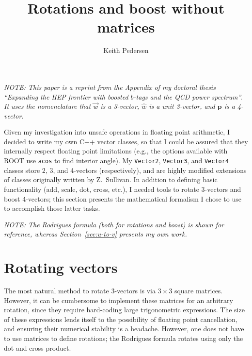 \documentclass[12pt, nofootinbib, notitlepage]{revtex4}
\newcommand{\vecN}[1]{\hat{#1}}
\newcommand{\bs}[1]{\boldsymbol{#1}}
\newcommand{\Mu}[1]{\bs{#1}}
\begin{document}
\title{Rotations and boost without matrices}
\author{Keith Pedersen}

\maketitle

{\it NOTE: This paper is a reprint from the Appendix of my doctoral thesis 
``Expanding the HEP frontier with boosted $b$-tags and the QCD power spectrum''.
It uses the nomenclature that $\vec{w}$ is a 3-vector, 
$\vecN{w}$ is a unit 3-vector, and $\Mu{p}$ is a 4-vector.}
\medskip

Given my investigation into unsafe operations in floating point arithmetic, 
I decided to write my own C++ vector classes, so that I could be assured that
they internally respect floating point limitations
(e.g., the options available with ROOT use {\tt acos} to find interior angle).
My {\tt Vector2}, {\tt Vector3}, and {\tt Vector4} classes 
store 2, 3, and 4-vectors (respectively), 
and are highly modified extensions of classes originally written by Z.~Sullivan.
In addition to defining basic functionality (add, scale, dot, cross, etc.),
I needed tools to rotate 3-vectors and boost 4-vectors;
this section presents the mathematical formalism I chose to use to 
accomplish those latter tasks.

{\it NOTE: The Rodrigues formula (both for rotations and boost) is shown for reference, 
whereas Section~\ref{sec:u-to-v} presents my own work.}

\section{Rotating vectors}%
%
The most natural method to rotate 3-vectors is via $3\times3$ square matrices.
However, it can be cumbersome to implement these matrices for an arbitrary rotation, 
since they require hard-coding large trigonometric expressions.
The size of these expressions lends itself to the possibility of
floating point cancellation,
and ensuring their numerical stability is a headache.
However, one does not have to use matrices to define rotations;
the Rodrigues formula rotates using only the dot and cross product.
\end{document}
